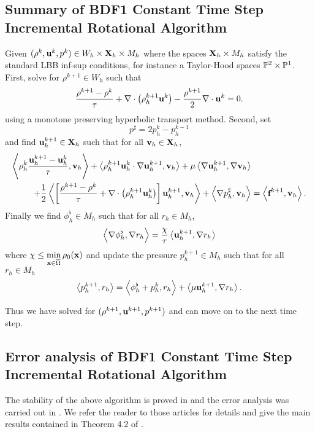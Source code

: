 \documentclass[letterpaper]{erdc}
\begin{document}
\subsection{Summary of BDF1 Constant Time Step Incremental Rotational Algorithm}\label{subsec:BDF1constantTimeSummary}
Given $(\rho^{k}, \textbf{u}^{k}, p^{k})\in W_h\times \textbf{X}_h\times M_h$ where the spaces $\textbf{X}_h\times M_h$ satisfy the standard LBB inf-sup conditions, for instance a Taylor-Hood spaces $\mathbb{P}^2\times\mathbb{P}^1$.   First, solve for $\rho^{k+1}\in W_h$ such that
\begin{equation}
  \frac{\rho^{k+1} - \rho^k}{\tau} + \nabla\cdot\left(\rho_h^{k+1}\textbf{u}^{k} \right) - \frac{\rho^{k+1}}{2}\nabla\cdot\textbf{u}^{k} = 0.
\end{equation}
using a monotone preserving hyperbolic transport method.  Second,
set 
\begin{equation}
  p^{\sharp} = 2p_h^{k} - p_h^{k-1}
\end{equation}
and find $\textbf{u}^{k+1}_h\in\textbf{X}_h$ such that for all $\textbf{v}_h\in\textbf{X}_h$,
\begin{equation}
  \begin{split}
\left\langle  \rho_h^{k}\frac{\textbf{u}_h^{k+1}-\textbf{u}_h^{k} }{\tau} , \textbf{v}_h \right\rangle + \left\langle  \rho_h^{k+1}\textbf{u}_h^{k}\cdot\nabla\textbf{u}_h^{k+1} , \textbf{v}_h \right\rangle + \mu\left\langle  \nabla \textbf{u}_h^{k+1} , \nabla\textbf{v}_h \right\rangle& \\
+ \frac{1}{2}\left\langle \left[\frac{\rho^{k+1}-\rho^{k}}{\tau} + \nabla\cdot\left(\rho_h^{k+1}\textbf{u}_h^{k}\right)\right]\textbf{u}_h^{k+1} , \textbf{v}_h \right\rangle +\left\langle \nabla p_h^{\sharp}, \textbf{v}_h \right\rangle &= \left\langle \textbf{f}^{k+1}, \textbf{v}_h \right\rangle.
\end{split}
\end{equation}
Finally we find $\phi_h^{\flat}\in M_h$ such that for all $r_h\in M_h$,
\begin{equation}
  \left\langle \nabla\phi_h^{\flat}, \nabla r_h \right\rangle = \frac{\chi}{\tau}\left\langle \textbf{u}_h^{k+1}, \nabla r_h \right\rangle
\end{equation}
where $\chi \leq \displaystyle\min_{\textbf{x}\in\overline{\Omega}}\rho_0(\textbf{x})$ and update the pressure $p_h^{k+1}\in M_h$ such that for all $r_h\in M_h$
\begin{equation}
  \left\langle p_h^{k+1}, r_h \right\rangle = \left\langle \phi_h^{\flat} + p_h^{k}, r_h \right\rangle + \left\langle \mu\textbf{u}_h^{k+1}, \nabla r_h \right\rangle.
\end{equation}

Thus we have solved for $(\rho^{k+1}, \textbf{u}^{k+1}, p^{k+1})$ and can move on to the next time step.


\subsection{Error analysis of BDF1 Constant Time Step Incremental Rotational Algorithm}
The stability of the above algorithm is proved in \cite{guermond2009splitting} and the error analysis was carried out in \cite{guermond2011error}.  We refer the reader to those articles for details and give the main results contained in Theorem 4.2 of \cite{guermond2011error}.
\end{document}
